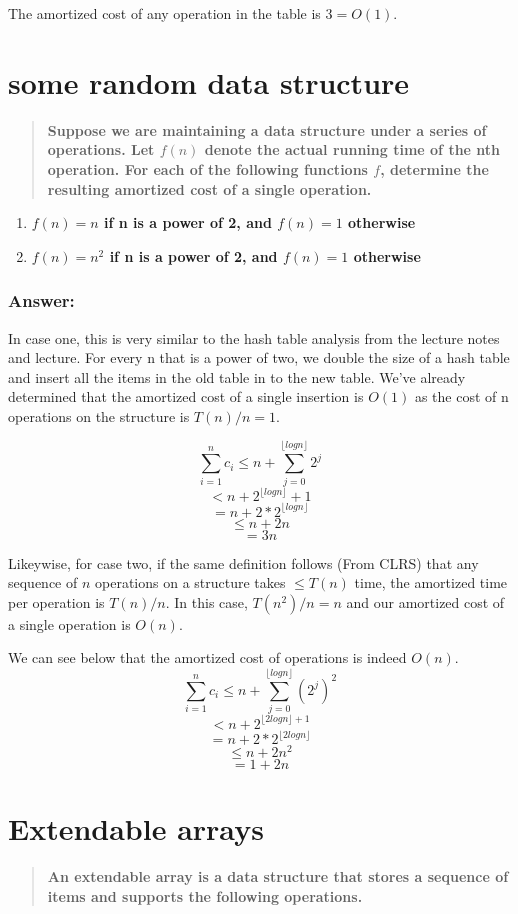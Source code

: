 \documentclass[titlepage]{article}\usepackage[]{graphicx}\usepackage[]{color}
\begin{document}
The amortized cost of any operation in the table is $3 = O(1)$.  


\section{some random data structure}
\begin{quote}
  \textbf{Suppose we are maintaining a data structure under a series of
  operations. Let $f(n)$ denote the actual running time of the nth operation.
For each of the following functions $f$, determine the resulting amortized cost
of a single operation.}
\end{quote}

\begin{enumerate}
  \item \textbf{ $f(n) = n$ if n is a power of 2, and $f(n) = 1$ otherwise}
  \item \textbf{ $f(n) = n^2$ if n is a power of 2, and $f(n) = 1$ otherwise}
\end{enumerate}

\subsubsection{Answer: }
In case one, this is very similar to the hash table analysis from the lecture
notes and lecture. For every n that is a power of two, we double the size of a
hash table and insert all the items in the old table in to the new table. We've
already determined that the amortized cost of a single insertion is $O(1)$ as
the cost of n operations on the structure is $T(n)/n = 1$. 

\[ \sum_{i=1}^n c_i \leq n + \sum_{j=0}^{\lfloor log n \rfloor} 2^j \]
\[ < n + 2^{\lfloor log n \rfloor} +1 \]
\[ = n + 2 * 2^{\lfloor log n \rfloor} \] 
\[\leq n + 2n \]
\[ = 3n \]

Likeywise, for case two, if the same definition follows (From CLRS) that any
sequence of $n$ operations on a structure takes $\leq T(n)$ time, the amortized
time per operation is $T(n)/n$. In this case, $T(n^2)/n = n$ and our amortized
cost of a single operation is $O(n)$. 

We can see below that the amortized cost of operations is indeed $O(n)$.
\[ \sum_{i=1}^n c_i \leq n + \sum_{j=0}^{\lfloor log n \rfloor} (2^j)^2 \]
\[ < n + 2^{ \lfloor 2log n \rfloor +1 }\]
\[ = n + 2 * 2^{\lfloor 2 log n \rfloor} \] 
\[\leq n + 2n^2 \]
\[ = 1 + 2n \]


\section{Extendable arrays}
\begin{quote}
  \textbf{An extendable array is a data structure that stores a sequence of
  items and supports the following operations.}
\end{quote}
\end{document}
